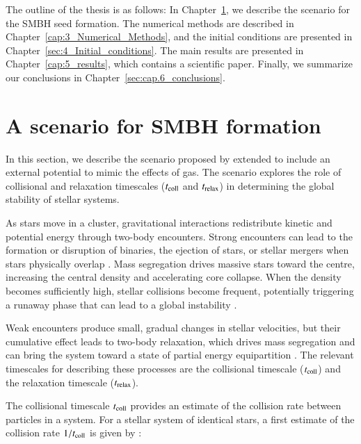 The outline of the thesis is as follows: In Chapter~\ref{chap:2_SMBH_formation_scenario}, we describe the scenario for the SMBH seed formation. The numerical methods are described in Chapter~\ref{cap:3_Numerical_Methods}, and the initial conditions are presented in Chapter~\ref{sec:4_Initial_conditions}. The main results are presented in Chapter~\ref{cap:5_results}, which contains a scientific paper. Finally, we summarize our conclusions in Chapter~\ref{sec:cap.6_conclusions}.
\chapter{A scenario for SMBH formation}
\label{chap:2_SMBH_formation_scenario}

In this section, we describe the scenario proposed by \citet{escala2021observational} extended to include an external potential to mimic the effects of gas. The scenario explores the role of collisional and relaxation timescales ($t_{\rm coll}$ and $t_{\rm relax}$) in determining the global stability of stellar systems. 

As stars move in a cluster, gravitational interactions redistribute kinetic and potential energy through two-body encounters. Strong encounters can lead to the formation or disruption of binaries, the ejection of stars, or stellar mergers when stars physically overlap \citep{2008gady.book.....B,1987degc.book.....S}. Mass segregation drives massive stars toward the centre, increasing the central density and accelerating core collapse. When the density becomes sufficiently high, stellar collisions become frequent, potentially triggering a runaway phase that can lead to a global instability \citep{escala2021observational}. 

Weak encounters produce small, gradual changes in stellar velocities, but their cumulative effect leads to two-body relaxation, which drives mass segregation and can bring the system toward a state of partial energy equipartition \citep{trenti2013no,bianchini2016novel}. The relevant timescales for describing these processes are the collisional timescale ($t_{\rm coll}$) and the relaxation timescale ($t_{\rm relax}$).

The collisional timescale $t_{\rm coll}$ provides an estimate of the collision rate between particles in a system. For a stellar system of identical stars, a first estimate of the collision rate $1/t_{\rm coll}$ is given by \citet{2008gady.book.....B}:

